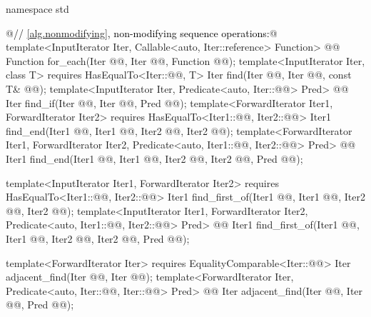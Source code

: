 \documentclass[american,twoside]{book}
\begin{document}
\begin{paras}
\color{addclr}
\begin{codeblock}
namespace std {
  @\textcolor{black}{// \ref{alg.nonmodifying}, non-modifying sequence operations:}@
  template<InputIterator Iter, Callable<auto, Iter::reference> Function>
    @@
    Function for_each(Iter @@, Iter @@, Function @@);
  template<InputIterator Iter, class T>
    requires HasEqualTo<Iter::@@, T>
    Iter find(Iter @@, Iter @@, const T& @@);
  template<InputIterator Iter, Predicate<auto, Iter::@@> Pred>
    @@
    Iter find_if(Iter @@, Iter @@, Pred @@);
  template<ForwardIterator Iter1, ForwardIterator Iter2>
    requires HasEqualTo<Iter1::@@, Iter2::@@>
    Iter1 find_end(Iter1 @@, Iter1 @@,
                   Iter2 @@, Iter2 @@);
  template<ForwardIterator Iter1, ForwardIterator Iter2, 
           Predicate<auto, Iter1::@@, Iter2::@@> Pred>
    @@
    Iter1 find_end(Iter1 @@, Iter1 @@,
                   Iter2 @@, Iter2 @@,
                   Pred @@);

  template<InputIterator Iter1, ForwardIterator Iter2>
    requires HasEqualTo<Iter1::@@, Iter2::@@>
    Iter1 find_first_of(Iter1 @@, Iter1 @@,
                        Iter2 @@, Iter2 @@);
  template<InputIterator Iter1, ForwardIterator Iter2,
           Predicate<auto, Iter1::@@, Iter2::@@> Pred>
    @@
    Iter1 find_first_of(Iter1 @@, Iter1 @@,
                        Iter2 @@, Iter2 @@,
                        Pred @@);

  template<ForwardIterator Iter>
    requires EqualityComparable<Iter::@@>
    Iter adjacent_find(Iter @@, Iter @@);
  template<ForwardIterator Iter, 
           Predicate<auto, Iter::@@, Iter::@@> Pred>
    @@
    Iter adjacent_find(Iter @@, Iter @@, Pred @@);

}
\end{codeblock}
\end{paras}
\end{document}
